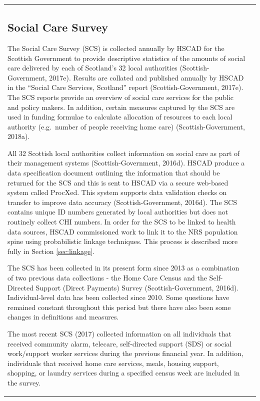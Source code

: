 \documentclass[12pt,a4paper,oneside,table]{report}
\begin{document}
\begin{tabular}[t]{ll}
\subsection{Social Care Survey}\label{subsec:source-sc}

The Social Care Survey (SCS) is collected annually by HSCAD for the
Scottish Government to provide descriptive statistics of the amounts of
social care delivered by each of Scotland's 32 local authorities
(Scottish-Government, 2017e). Results are collated and published
annually by HSCAD in the ``Social Care Services, Scotland'' report
(Scottish-Government, 2017e). The SCS reports provide an overview of
social care services for the public and policy makers. In addition,
certain measures captured by the SCS are used in funding formulae to
calculate allocation of resources to each local authority (e.g.~number
of people receiving home care) (Scottish-Government, 2018a).

All 32 Scottish local authorities collect information on social care as
part of their management systems (Scottish-Government, 2016d). HSCAD
produce a data specification document outlining the information that
should be returned for the SCS and this is sent to HSCAD via a secure
web-based system called ProcXed. This system supports data validation
checks on transfer to improve data accuracy (Scottish-Government,
2016d). The SCS contains unique ID numbers generated by local
authorities but does not routinely collect CHI numbers. In order for the
SCS to be linked to health data sources, HSCAD commissioned work to link
it to the NRS population spine using probabilistic linkage techniques.
This process is described more fully in Section \ref{sec:linkage}.

The SCS has been collected in its present form since 2013 as a
combination of two previous data collections - the Home Care Census and
the Self-Directed Support (Direct Payments) Survey (Scottish-Government,
2016d). Individual-level data has been collected since 2010. Some
questions have remained constant throughout this period but there have
also been some changes in definitions and measures.

The most recent SCS (2017) collected information on all individuals that
received community alarm, telecare, self-directed support (SDS) or
social work/support worker services during the previous financial year.
In addition, individuals that received home care services, meals,
housing support, shopping, or laundry services during a specified census
week are included in the survey.


\end{tabular}
\end{document}
